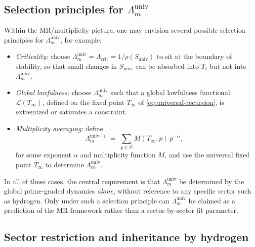 \documentclass[11pt,a4paper]{article}
\newcommand{\LambdaMuniv}{\Lambda_{m}^{\mathrm{univ}}}
\begin{document}
\subsection{Selection principles for $\Lambda_m^{\text{univ}}$}

Within the MR/multiplicity picture, one may envision several possible
selection principles for $\LambdaMuniv$, for example:
\begin{itemize}
  \item \emph{Criticality:} choose
    $\LambdaMuniv = \Lambda_{\text{crit}} = 1/\rho(S_{\text{univ}})$
    to sit at the boundary of stability, so that small changes in
    $S_{\text{univ}}$ can be absorbed into $T_t$ but not into
    $\LambdaMuniv$.
  \item \emph{Global lawfulness:} choose $\LambdaMuniv$ such that a
    global lawfulness functional $\mathcal{L}(T_\infty)$, defined on
    the fixed point $T_\infty$ of \eqref{eq:universal-recursion}, is
    extremized or saturates a constraint.
  \item \emph{Multiplicity averaging:} define
    \begin{equation}
      \LambdaMuniv^{-1}
      \;=\;
      \sum_{p \in \mathcal{P}} M(T_\infty,p)\,p^{-\alpha},
    \end{equation}
    for some exponent $\alpha$ and multiplicity function $M$, and use
    the universal fixed point $T_\infty$ to determine $\LambdaMuniv$.
\end{itemize}
In all of these cases, the central requirement is that $\LambdaMuniv$ be
determined by the global prime-graded dynamics \emph{alone}, without
reference to any specific sector such as hydrogen. Only under such a
selection principle can $\LambdaMuniv$ be claimed as a prediction of the
MR framework rather than a sector-by-sector fit parameter.

\subsection{Sector restriction and inheritance by hydrogen}
\end{document}
